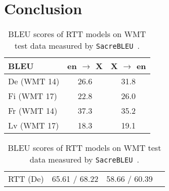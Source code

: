 \documentclass[11pt]{article}
\begin{document}
\section{Conclusion}

\begin{table}[t]
	\scriptsize
	\fontsize{7.5pt}{8.5pt}\selectfont
	\centering
	\begin{tabular}{lcc}
		\hline
		BLEU & en $\to$ X & X $\to$ en \\
		\hline
		De (WMT 14) & 26.6 & 31.8 \\
		Fi (WMT 17) & 22.8 & 26.0 \\
		Fr (WMT 14) & 37.3 & 35.2 \\
		Lv (WMT 17) & 18.3 & 19.1 \\
		\hline
	\end{tabular}
	\caption{BLEU scores of RTT models on WMT test data measured by \texttt{SacreBLEU}~\citep{post-2018-call}.}
	\label{tab:bleu}
	\vspace{1.0em}
	\scriptsize
	\fontsize{7.5pt}{8.5pt}\selectfont
	\centering
	\begin{tabular}{lccc}
		\hline
		& \hspace{-1em}{$\def\arraystretch{0.5}\begin{array}{c}\vspace{-0.5em}\\\text{BEA-19}\\\text{test}\\\end{array}$}\hspace{-1em}
		& \hspace{-1em}{$\def\arraystretch{0.5}\begin{array}{c}\vspace{-0.5em}\\\text{CoNLL}\\\text{14}\\\end{array}$}\hspace{-1em}
		& \hspace{-1em}{$\def\arraystretch{0.5}\begin{array}{c}\vspace{-0.5em}\\\text{JFLEG}\\\text{test}\\\end{array}$}\hspace{-1em}
		\\
		\hline
		RTT (De)
			& 65.61 / 68.22
			& 58.66 / 60.39

\end{tabular}
\end{table}
\end{document}
